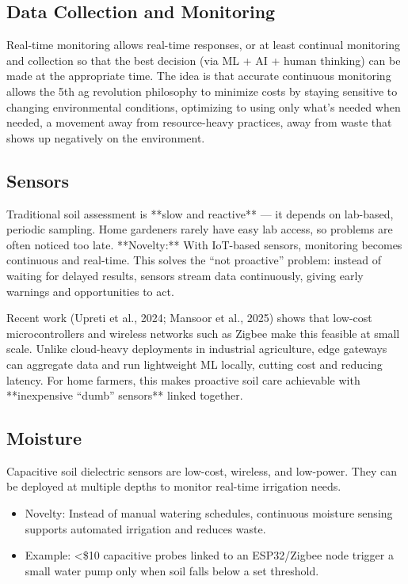 \documentclass{sigchi}
\begin{document}
\subsection{Data Collection and Monitoring}

Real-time monitoring allows real-time responses, or at least continual monitoring and collection so that the best decision (via ML + AI + human thinking) can be made at the appropriate time. The idea is that accurate continuous monitoring allows the 5th ag revolution philosophy to minimize costs by staying sensitive to changing environmental conditions, optimizing to using only what's needed when needed, a movement away from resource-heavy practices, away from waste that shows up negatively on the environment.

\subsection{Sensors}

Traditional soil assessment is **slow and reactive** — it depends on lab-based, periodic sampling. Home gardeners rarely have easy lab access, so problems are often noticed too late.
**Novelty:** With IoT-based sensors, monitoring becomes continuous and real-time. This solves the “not proactive” problem: instead of waiting for delayed results, sensors stream data continuously, giving early warnings and opportunities to act.

Recent work (Upreti et al., 2024; Mansoor et al., 2025) shows that low-cost microcontrollers and wireless networks such as Zigbee make this feasible at small scale. Unlike cloud-heavy deployments in industrial agriculture, edge gateways can aggregate data and run lightweight ML locally, cutting cost and reducing latency. For home farmers, this makes proactive soil care achievable with **inexpensive “dumb” sensors** linked together.

\subsection{Moisture}
Capacitive soil dielectric sensors are low-cost, wireless, and low-power. They can be deployed at multiple depths to monitor real-time irrigation needs.
\begin{itemize}
	\item Novelty: Instead of manual watering schedules, continuous moisture sensing supports automated irrigation and reduces waste.
	\item Example: <\$10 capacitive probes linked to an ESP32/Zigbee node trigger a small water pump only when soil falls below a set threshold.
\end{itemize}
\end{document}

